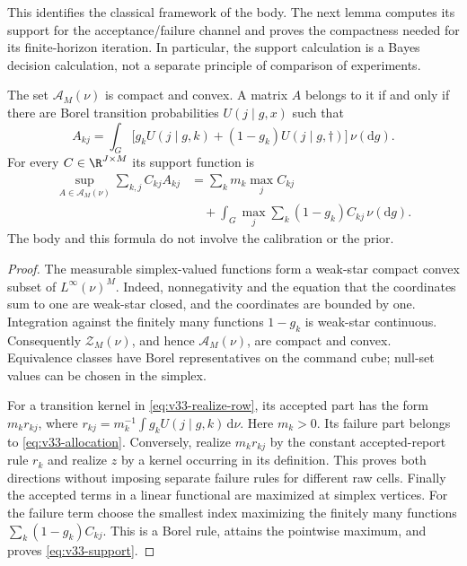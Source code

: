 This identifies the classical framework of the body. The next lemma
computes its support for the acceptance/failure channel and proves the
compactness needed for its finite-horizon iteration. In particular,
the support calculation is a Bayes decision calculation, not a separate
principle of comparison of experiments.

\begin{lemma}\label{lem:v33-body}
The set $\mathscr A_M(\nu)$ is compact and convex. A matrix $A$ belongs
to it if and only if there are Borel transition probabilities
$U(j\mid g,x)$ such that
\begin{equation}\label{eq:v33-realize-row}
 A_{kj}=\int_G\bigl[g_k U(j\mid g,k)
                 +(1-g_k)U(j\mid g,\dagger)\bigr]\,\nu(\mathrm dg).
\end{equation}
For every $C\in\R^{J\times M}$ its support function is
\begin{equation}\label{eq:v33-support}
 \begin{split}
 \sup_{A\in\mathscr A_M(\nu)}\sum_{k,j}C_{kj}A_{kj}
 &=\sum_k m_k\max_j C_{kj}\\
 &\quad+\int_G\max_j\sum_k(1-g_k)C_{kj}\,\nu(\mathrm dg).
 \end{split}
\end{equation}
The body and this formula do not involve the calibration or the prior.
\end{lemma}
\begin{proof}
The measurable simplex-valued functions form a weak-star compact convex
subset of $L^\infty(\nu)^M$. Indeed, nonnegativity and the equation that
the coordinates sum to one are weak-star closed, and the coordinates
are bounded by one. Integration against the finitely many functions
$1-g_k$ is weak-star continuous. Consequently $\mathscr Z_M(\nu)$,
and hence $\mathscr A_M(\nu)$, are compact and convex. Equivalence
classes have Borel representatives on the command cube; null-set
values can be chosen in the simplex.

For a transition kernel in \eqref{eq:v33-realize-row}, its accepted
part has the form $m_k r_{kj}$, where
$r_{kj}=m_k^{-1}\int g_k U(j\mid g,k)\,\mathrm d\nu$. Here $m_k>0$.
Its failure part belongs to \eqref{eq:v33-allocation}. Conversely,
realize $m_k r_{kj}$ by the constant accepted-report rule $r_k$ and
realize $z$ by a kernel occurring in its definition. This proves both
directions without imposing separate failure rules for different raw
cells. Finally the accepted terms in a linear functional are maximized
at simplex vertices. For the failure term choose the smallest index
maximizing the finitely many functions
$\sum_k(1-g_k)C_{kj}$. This is a Borel rule, attains the pointwise
maximum, and proves \eqref{eq:v33-support}.
\end{proof}

